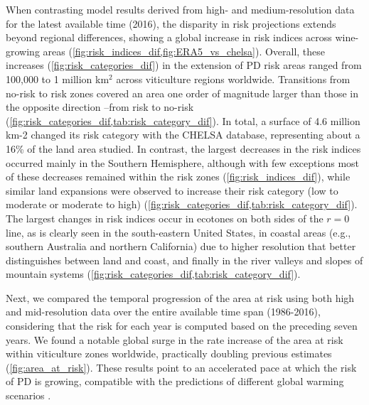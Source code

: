 When contrasting model results derived from high- and medium-resolution
data for the latest available time (2016), the disparity in risk projections
extends beyond regional differences, showing a global increase in risk indices
across wine-growing areas (\cref{fig:risk_indices_dif,fig:ERA5_vs_chelsa}).
Overall, these increases
(\cref{fig:risk_categories_dif}) in the extension of PD risk areas ranged from
100,000 to 1 million km$^2$ across viticulture regions worldwide. Transitions
from no-risk to risk zones covered an area one order of magnitude larger than
those in the opposite direction --from risk to no-risk
(\cref{fig:risk_categories_dif,tab:risk_category_dif}). In total, a surface of
4.6 million km-2 changed its risk category with the CHELSA database,
representing about a 16\% of the land area studied. In contrast, the largest
decreases in the risk indices occurred mainly in the Southern Hemisphere,
although with few exceptions most of these decreases remained within the risk
zones (\cref{fig:risk_indices_dif}), while similar land expansions were
observed to  increase their risk category (low to moderate or moderate to high)
(\cref{fig:risk_categories_dif,tab:risk_category_dif}). The largest changes in
risk indices occur in ecotones on both sides of the $r=0$ line, as is clearly
seen in the south-eastern United States, in coastal areas (e.g., southern
Australia and northern California) due to higher resolution that better
distinguishes between land and coast, and finally in the river valleys and
slopes of mountain systems
(\cref{fig:risk_categories_dif,tab:risk_category_dif}).

Next, we compared the temporal progression of the area at risk using both
high and mid-resolution data over the entire available time span (1986-2016),
considering that the risk for each year is computed based on the preceding
seven years. We found a notable global surge in the rate increase of the area
at risk within viticulture zones worldwide, practically doubling previous
estimates (\cref{fig:area_at_risk}). These results point to an
accelerated
pace at which the risk of PD is growing, compatible with the predictions of
different global warming scenarios \cite{GimenezRomero2023_PD}.

